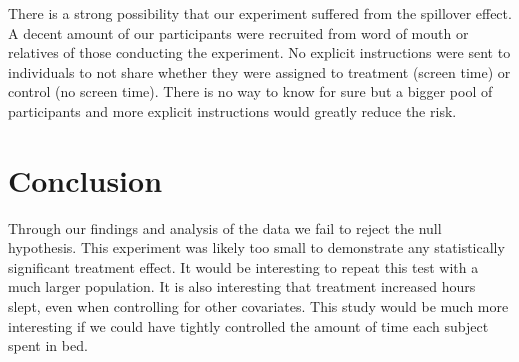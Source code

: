 \documentclass[12pt,]{article}
\begin{document}
There is a strong possibility that our experiment suffered from the
spillover effect. A decent amount of our participants were recruited
from word of mouth or relatives of those conducting the experiment. No
explicit instructions were sent to individuals to not share whether they
were assigned to treatment (screen time) or control (no screen time).
There is no way to know for sure but a bigger pool of participants and
more explicit instructions would greatly reduce the risk.

\section{Conclusion}\label{conclusion}

Through our findings and analysis of the data we fail to reject the null
hypothesis. This experiment was likely too small to demonstrate any
statistically significant treatment effect. It would be interesting to
repeat this test with a much larger population. It is also interesting
that treatment increased hours slept, even when controlling for other
covariates. This study would be much more interesting if we could have
tightly controlled the amount of time each subject spent in bed.
\end{document}
